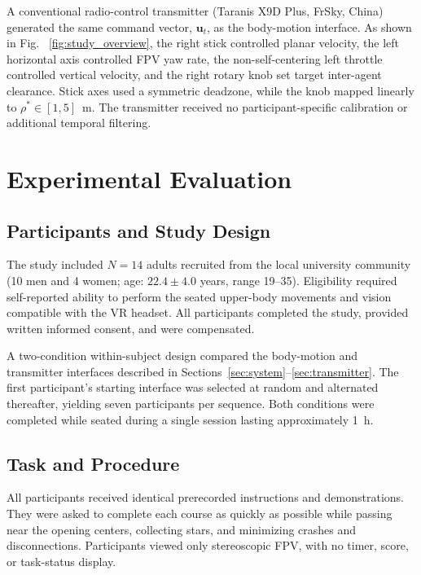 \documentclass[a4paper,10pt,conference]{ieeeconf}
\begin{document}
A conventional radio-control transmitter (Taranis X9D Plus, FrSky, China) generated the same command vector, $\mathbf{u}_t$, as the body-motion interface. As shown in Fig. ~\ref{fig:study_overview}, the right stick controlled planar
velocity, the left horizontal axis controlled FPV yaw rate, the
non-self-centering left throttle controlled vertical velocity, and the right
rotary knob set target inter-agent clearance. Stick axes used a symmetric
deadzone, while the knob mapped linearly
to $\rho^*\in[1,5]$~m. The transmitter received no participant-specific
calibration or additional temporal filtering.


\label{sec:experiment}

\section{Experimental Evaluation}
\label{sec:experiment}


\subsection{Participants and Study Design}
\label{sec:participants_design}

The study included $N=14$ adults recruited from the local university
community (10 men and 4 women; age: $22.4 \pm 4.0$ years, range 19--35).
Eligibility required self-reported ability to perform the seated
upper-body movements and vision compatible with the VR headset. All
participants completed the study, provided written informed consent, and were
compensated.

A two-condition within-subject design compared the body-motion and transmitter interfaces described in Sections~\ref{sec:system}--\ref{sec:transmitter}. The
first participant's starting interface was selected at random and alternated
thereafter, yielding seven participants per sequence. Both conditions were
completed while seated during a single session lasting approximately 1~h.

\subsection{Task and Procedure}
\label{sec:task}



All participants received identical prerecorded instructions and
demonstrations. They were asked to complete each course as quickly as possible while passing near the opening centers, collecting stars, and minimizing crashes and disconnections. Participants viewed only stereoscopic FPV, with no timer, score, or task-status display.
\end{document}
